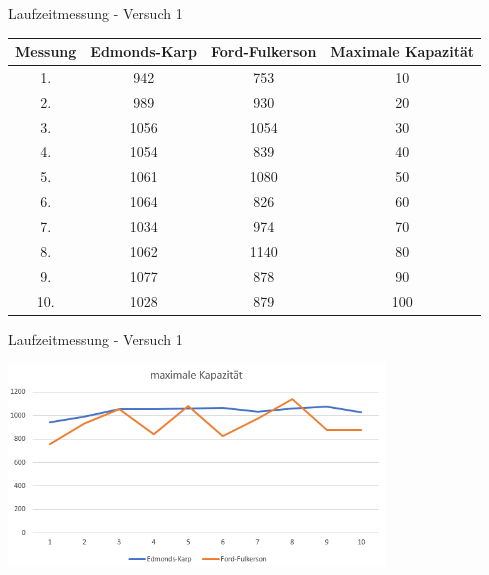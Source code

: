 \documentclass{beamer}
\begin{document}
    \begin{frame}{Laufzeitmessung - Versuch 1}
        \begin{center}
            \begin{tabular}{c|c|c|c}
                Messung & \textbf{Edmonds-Karp} & \textbf{Ford-Fulkerson} & Maximale Kapazit\"at\\
                \hline
                1. & 942 & 753 & 10\\
                2. & 989 & 930 & 20\\
                3. & 1056 & 1054 & 30\\
                4. & 1054 & 839 & 40\\
                5. & 1061 & 1080 & 50\\
                6. & 1064 & 826 & 60\\
                7. & 1034 & 974 & 70\\
                8. & 1062 & 1140 & 80\\
                9. & 1077 & 878 & 90\\
                10. & 1028 & 879 & 100\\
            \end{tabular}
        \end{center}
    \end{frame}

    \begin{frame}{Laufzeitmessung - Versuch 1}
        \begin{center}
            \includegraphics[width=10cm]{../max-capacity-graph.PNG}
        \end{center}
    \end{frame}
\end{document}
